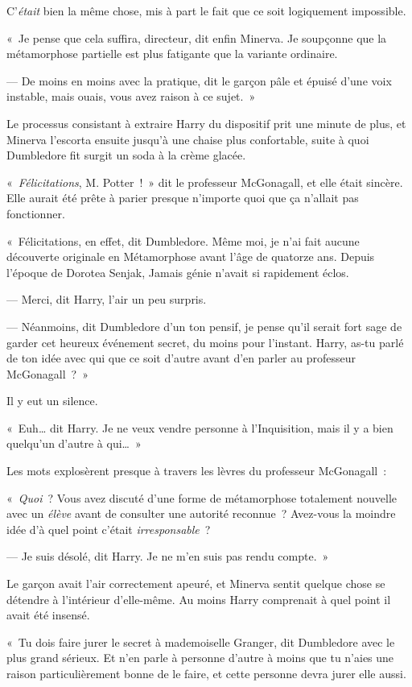 C'\emph{était} bien la même chose, mis à part le fait que ce soit logiquement impossible.

«~Je pense que cela suffira, directeur, dit enfin Minerva.
Je soupçonne que la métamorphose partielle est plus fatigante que la variante ordinaire.

--- De moins en moins avec la pratique, dit le garçon pâle et épuisé d'une voix instable, mais ouais, vous avez raison à ce sujet.~»

Le processus consistant à extraire Harry du dispositif prit une minute de plus, et Minerva l'escorta ensuite jusqu'à une chaise plus confortable, suite à quoi Dumbledore fit surgit un soda à la crème glacée.

«~\emph{Félicitations}, M. Potter~!~»
dit le professeur McGonagall, et elle était sincère.
Elle aurait été prête à parier presque n'importe quoi que ça n'allait pas fonctionner.

«~Félicitations, en effet, dit Dumbledore.
Même moi, je n'ai fait aucune découverte originale en Métamorphose avant l'âge de quatorze ans.
Depuis l'époque de Dorotea Senjak, Jamais génie n'avait si rapidement éclos.

--- Merci, dit Harry, l'air un peu surpris.

--- Néanmoins, dit Dumbledore d'un ton pensif, je pense qu'il serait fort sage de garder cet heureux événement secret, du moins pour l'instant.
Harry, as-tu parlé de ton idée avec qui que ce soit d'autre avant d'en parler au professeur McGonagall~?~»

Il y eut un silence.

«~Euh… dit Harry.
Je ne veux vendre personne à l'Inquisition, mais il y a bien quelqu'un d'autre à qui…~»

Les mots explosèrent presque à travers les lèvres du professeur McGonagall~:

«~\emph{Quoi}~?
Vous avez discuté d'une forme de métamorphose totalement nouvelle avec un \emph{élève} avant de consulter une autorité reconnue~?
Avez-vous la moindre idée d'à quel point c'était \emph{irresponsable}~?

--- Je suis désolé, dit Harry.
Je ne m'en suis pas rendu compte.~»

Le garçon avait l'air correctement apeuré, et Minerva sentit quelque chose se détendre à l'intérieur d'elle-même.
Au moins Harry comprenait à quel point il avait été insensé.

«~Tu dois faire jurer le secret à mademoiselle Granger, dit Dumbledore avec le plus grand sérieux.
Et n'en parle à personne d'autre à moins que tu n'aies une raison particulièrement bonne de le faire, et cette personne devra jurer elle aussi.

